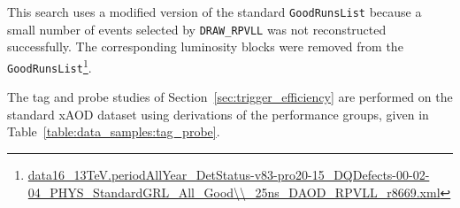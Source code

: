 \begin{table}[!htb]
  \centering
  \caption{Dataset used in \texttt{DRAW\_RPVLL}, \texttt{DAOD\_RPVLL}, and \texttt{DAOD\_SUSY15} format.}
  \label{table:data_samples}
\end{table}

This search uses a modified version of the standard \texttt{GoodRunsList} because a small number of events selected by \texttt{DRAW\_RPVLL} was not reconstructed successfully. The corresponding luminosity blocks were removed from the \texttt{GoodRunsList}\footnote{\url{data16\_13TeV.periodAllYear\_DetStatus-v83-pro20-15\_DQDefects-00-02-04\_PHYS\_StandardGRL\_All\_Good\\\_25ns\_DAOD\_RPVLL\_r8669.xml}}.


The tag and probe studies of Section~\ref{sec:trigger_efficiency} are performed on the standard xAOD dataset using derivations of the performance groups, given in Table~\ref{table:data_samples:tag_probe}.  

\begin{table}[!htb]
  \centering
  \caption{Datasets used for tag and probe studies.}
  \label{table:data_samples:tag_probe}
\end{table}



